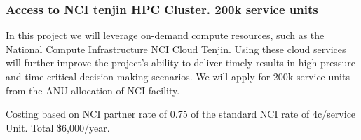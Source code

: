 \documentclass[a4paper,fontsize=12pt]{scrartcl}
\begin{document}
\subsubsection*{Access to NCI tenjin HPC Cluster. 200k service units}

In this project we will leverage on-demand compute resources, such as the National Compute
Infrastructure NCI Cloud Tenjin. Using these cloud
services will further improve the project's ability to deliver timely
results in high-pressure and time-critical decision making scenarios. We will apply for 200k service units 
from the ANU allocation of NCI facility.  

Costing based on NCI partner rate of 0.75  of the standard NCI rate of 4c/service Unit. Total \$6,000/year. 
\end{document}
